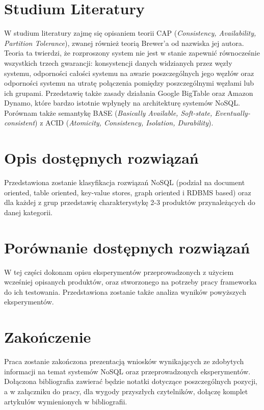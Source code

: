 \documentclass[a4paper,11pt]{article}
\begin{document}
\section{Studium Literatury}
W studium literatury zajmę się opisaniem teorii CAP\cite{brewers-conjecture}
(\emph{Consistency, Availability, Partition Tolerance}), zwanej również
teorią Brewer'a od nazwiska jej autora. Teoria ta twierdzi, że rozproszony
system nie jest w stanie zapewnić równocześnie wszystkich trzech gwarancji:
konsystencji danych widzianych przez węzły systemu, odporności całości systemu
na awarie poszczególnych jego węzłów oraz odporności systemu na utratę
połączenia pomiędzy poszczególnymi węzłami lub ich grupami. Przedstawię także
zasady działania Google BigTable\cite{google-bigtable} oraz Amazon
Dynamo\cite{amazon-dynamo}, które bardzo istotnie wpłynęły na architekturę
systemów NoSQL. Porównam także semantykę BASE (\emph{Basically Available,
Soft-state, Eventually-consistent}) z ACID (\emph{Atomicity, Consistency,
Isolation, Durability}).

\section{Opis dostępnych rozwiązań}
Przedstawiona zostanie klasyfikacja rozwiązań NoSQL (podział na document
oriented, table oriented, key-value stores, graph oriented i RDBMS based) oraz
dla każdej z grup przedstawię charakterystykę 2-3 produktów przynależących do
danej kategorii.

\section{Porównanie dostępnych rozwiązań}
W tej części dokonam opisu eksperymentów przeprowadzonych z użyciem wcześniej
opisanych produktów, oraz stworzonego na potrzeby pracy frameworka do ich
testowania. Przedstawiona zostanie także analiza wyników powyższych
eksperymentów.

\section{Zakończenie}
Praca zostanie zakończona prezentacją wniosków wynikających ze zdobytych
informacji na temat systemów NoSQL oraz przeprowadzonych eksperymentów.
Dołączona bibliografia zawierać będzie notatki dotyczące poszczególnych
pozycji, a w załączniku do pracy, dla wygody przyszłych czytelników,
dołączę komplet artykułów wymienionych w bibliografii.


\end{document}
